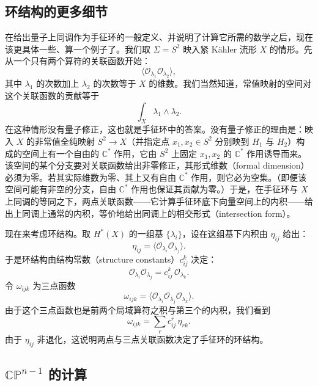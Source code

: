 \subsection{环结构的更多细节}

在给出量子上同调作为手征环的一般定义、并说明了计算它所需的数学之后，现在该更具体一些、算一个例子了。我们取 $\Sigma=S^2$ 映入紧 Kähler 流形 $X$ 的情形。先从一个只有两个算符的关联函数开始：
\[
  \langle \mathcal{O}_{\lambda_1}\mathcal{O}_{\lambda_2}\rangle,
\]
其中 $\lambda_1$ 的次数加上 $\lambda_2$ 的次数等于 $X$ 的维数。我们当然知道，常值映射的空间对这个关联函数的贡献等于
\[
  \int_X\lambda_1\wedge\lambda_2.
\]
在这种情形没有量子修正，这也就是手征环中的答案。没有量子修正的理由是：映入 $X$ 的非常值全纯映射 $S^2\to X$（并指定点 $x_1,x_2\in S^2$ 分别映到 $H_1$ 与 $H_2$）构成的空间上有一个自由的 $\mathbb{C}^*$ 作用，它由 $S^2$ 上固定 $x_1,x_2$ 的 $\mathbb{C}^*$ 作用诱导而来。该空间的某个分支要对关联函数给出非零修正，其形式维数（formal dimension）必须为零。若其实际维数为零、其上又有自由 $\mathbb{C}^*$ 作用，则它必为空集。（即便该空间可能有非空的分支，自由 $\mathbb{C}^*$ 作用也保证其贡献为零。）于是，在手征环与 $X$ 上同调的等同之下，两点关联函数——它计算手征环底下向量空间上的内积——给出上同调上通常的内积，等价地给出同调上的相交形式（intersection form）。


现在来考虑环结构。取 $H^*(X)$ 的一组基 $\{\lambda_i\}$，设在这组基下内积由 $\eta_{ij}$ 给出：
\[
  \eta_{ij}=\langle \mathcal{O}_{\lambda_i}\mathcal{O}_{\lambda_j}\rangle.
\]
于是环结构由结构常数（structure constants）$c_{ij}^k$ 决定：
\[
  \mathcal{O}_{\lambda_i}\mathcal{O}_{\lambda_j}=c_{ij}^k\,\mathcal{O}_{\lambda_k}.
\]
令 $\omega_{ijk}$ 为三点函数
\[
  \omega_{ijk}=\langle \mathcal{O}_{\lambda_i}\mathcal{O}_{\lambda_j}\mathcal{O}_{\lambda_k}\rangle.
\]
由于这个三点函数也是前两个局域算符之积与第三个的内积，我们看到
\[
  \omega_{ijk}=\sum_{r}c_{ij}^r\,\eta_{rk}.
\]
由于 $\eta_{ij}$ 非退化，这说明两点与三点关联函数决定了手征环的环结构。

\subsection{$\mathbb{CP}^{n-1}$ 的计算}

